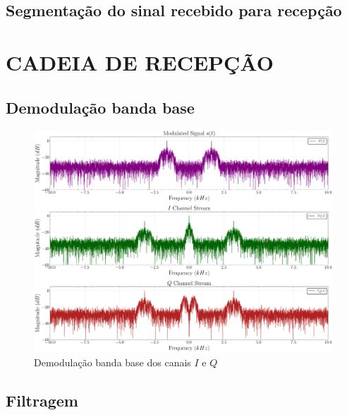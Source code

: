 \subsection{Segmentação do sinal recebido para recepção}\label{sec:segmentacao_recepcao}

\section{CADEIA DE RECEPÇÃO}\label{sec:recepcao}    

\subsection{Demodulação banda base}\label{sec:demodulacao}

\begin{figure}[H]
	\centering
	\caption{Demodulação banda base dos canais $I$ e $Q$}\label{fig:receiver_demodulator}
	\includegraphics[width=\linewidth]{assets/cap3/receiver_demodulator_freq.pdf}
\end{figure}

\subsection{Filtragem}\label{sec:filtragem}

